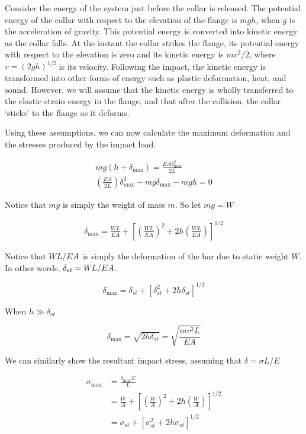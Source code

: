 \documentclass[
10pt,
a4paper,
openany,
svgnames,
]{kaobook} %
\begin{document}
  Consider the energy of the system just before the collar is released. The potential energy of the collar with respect to the elevation of the flange is $mgh$, when $g$ is the acceleration of gravity. This potential energy is converted into kinetic energy as the collar falls. At the instant the collar strikes the flange, its potential energy with respect to the elevation is zero and its kinetic energy is $mv^2/2$, where $v = (2gh)^{1/2}$ is its velocity. Following the impact, the kinetic energy is transformed into other forms of energy such as plastic deformation, heat, and sound. However, we will assume that the kinetic energy is wholly transferred to the elastic strain energy in the flange, and that after the collision, the collar `sticks' to the flange as it deforms.

Using these assumptions, we can now calculate the maximum deformation and the stresses produced by the impact load.

\begin{gather}
  mg(h+ \delta_{\max}) = \frac{EA \delta_{\max}^2}{2L} \nonumber \\
  \left( \frac{EA}{2L} \right) \delta_{\max}^2 - mg \delta_{\max} - mgh = 0 \nonumber
\end{gather}

Notice that $mg$ is simply the weight of mass $m$. So let $mg = W$

\begin{align}
  \delta_{\max} = \frac{WL}{EA} + \left[ \left( \frac{WL}{EA} \right)^2 + 2h \left( \frac{WL}{EA} \right) \right]^{1/2}
\end{align}

Notice that $W\mspace{-2mu}L/EA$ is simply the deformation of the bar due to static weight $W$. In other words, $\delta_{st} = W\mspace{-2mu}L/EA$.

\begin{equation}
  \delta_{\max} = \delta_{st} + \left[ \delta_{st}^2 + 2h\delta_{st} \right]^{1/2}
\end{equation}

When $h \gg \delta_{st}$

\begin{equation}
  \delta_{\max} = \sqrt{2h \delta_{st}} = \sqrt{ \frac{mv^2L}{EA} }
\end{equation}

We can similarly show the resultant impact stress, assuming that $\delta = \sigma L / E$

\begin{align}
  \sigma_{\max} &= \frac{\delta_{\max} E}{L} \nonumber \\
                &= \frac{W}{A} + \left[ \left( \frac{W}{A} \right)^2 + 2h \left( \frac{W}{A} \right) \right]^{1/2} \nonumber \\
                &= \sigma_{st} + \left[ \sigma_{st}^2 + 2h \sigma_{st} \right]^{1/2}
\end{align}
\end{document}
